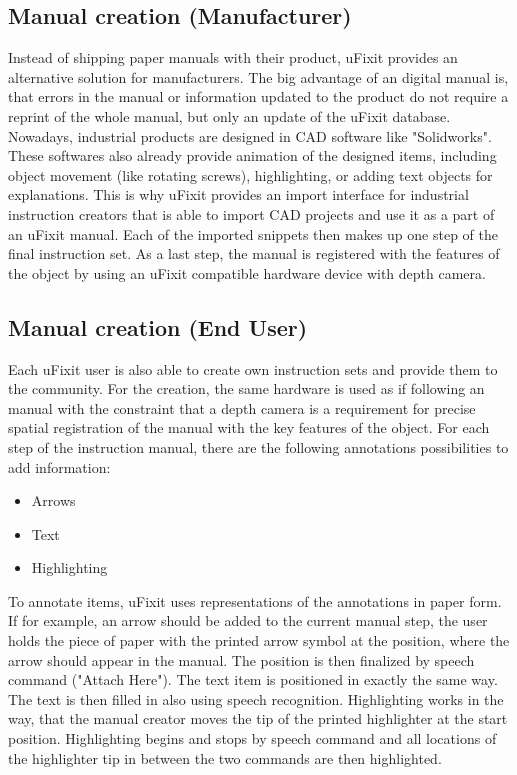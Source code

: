 \subsection{Manual creation (Manufacturer)}
Instead of shipping paper manuals with their product, uFixit provides an alternative solution for manufacturers. The big advantage of an digital manual is, that errors in the manual or information updated to the product do not require a reprint of the whole manual, but only an update of the uFixit database. Nowadays, industrial products are designed in CAD software like "Solidworks". These softwares also already provide animation of the designed items, including object movement (like rotating screws), highlighting, or adding text objects for explanations. This is why uFixit provides an import interface for industrial instruction creators that is able to import CAD projects and use it as a part of an uFixit manual. Each of the imported snippets then makes up one step of the final instruction set. As a last step, the manual is registered with the features of the object by using an uFixit compatible hardware device with depth camera.

\subsection{Manual creation (End User)}
Each uFixit user is also able to create own instruction sets and provide them to the community. For the creation, the same hardware is used as if following an manual with the constraint that a depth camera is a requirement for precise spatial registration of the manual with the key features of the object. For each step of the instruction manual, there are the following annotations possibilities to add information:

\begin{itemize}
\item Arrows
\item Text
\item Highlighting
\end{itemize}

To annotate items, uFixit uses representations of the annotations in paper form. If for example, an arrow should be added to the current manual step, the user holds the piece of paper with the printed arrow symbol at the position, where the arrow should appear in the manual. The position is then finalized by speech command ("Attach Here"). The text item is positioned in exactly the same way. The text is then filled in also using speech recognition. Highlighting works in the way, that the manual creator moves the tip of the printed highlighter at the start position. Highlighting begins and stops by speech command and all locations of the highlighter tip in between the two commands are then highlighted.

